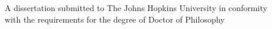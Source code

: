 
\begin{titlepage}

\singlespacing \centering       %
\thispagestyle{empty}           %


\vspace*{-\TitleTopOffset pt}   %


\vspace{1in}                    %


\vspace{1.5in}                  %


A dissertation submitted to The Johns Hopkins University in conformity \\
with the requirements for the degree of Doctor of Philosophy 
%
%
\vspace{0.5in} \\               %
%
%
\location \\                    %


\vspace{2 in}


\end{titlepage}
